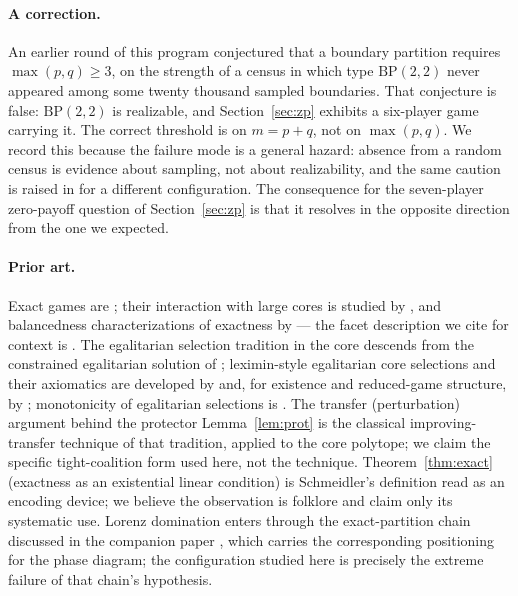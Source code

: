\documentclass[11pt]{article}
\newcommand{\PART}{\mathrm{BP}}
\begin{document}
\paragraph{A correction.}
An earlier round of this program conjectured that a boundary partition requires
$\max(p,q)\ge3$, on the strength of a census in which type $\PART(2,2)$ never
appeared among some twenty thousand sampled boundaries.  That conjecture is
false: $\PART(2,2)$ is realizable, and Section~\ref{sec:zp} exhibits a
six-player game carrying it.  The correct threshold is on $m=p+q$, not on
$\max(p,q)$.  We record this because the failure mode is a general hazard:
absence from a random census is evidence about sampling, not about
realizability, and the same caution is raised in \citep{Flanagan2026phase}
for a different configuration.  The consequence for the seven-player
zero-payoff question of Section~\ref{sec:zp} is that it resolves in the
opposite direction from the one we expected.

\paragraph{Prior art.}\label{sec:intro-priorart}
Exact games are \citet{Schmeidler1972}; their interaction with large cores
is studied by \citet{Biswas1999}, and balancedness characterizations of
exactness by \citet{CsokaHeringsKoczy2011} --- the facet description we cite
for context is \citet{StudenyKratochvil2022}.  The egalitarian selection
tradition in the core descends from the constrained egalitarian solution of
\citet{DuttaRay1989}; leximin-style egalitarian core selections and their
axiomatics are developed by \citet{ArinInarra2001} and, for existence and
reduced-game structure, by \citet{LlerenaMauri2016}; monotonicity of
egalitarian selections is \citet{Dietzenbacher2021}.  The transfer
(perturbation) argument behind the protector Lemma~\ref{lem:prot} is the
classical improving-transfer technique of that tradition, applied to the
core polytope; we claim the specific tight-coalition form used here, not
the technique.  Theorem~\ref{thm:exact} (exactness as an existential linear
condition) is Schmeidler's definition read as an encoding device; we
believe the observation is folklore and claim only its systematic use.
Lorenz domination enters through the exact-partition chain discussed in the
companion paper \citep{Flanagan2026phase}, which carries the corresponding
positioning for the phase diagram; the configuration studied here is
precisely the extreme failure of that chain's hypothesis.
\end{document}
